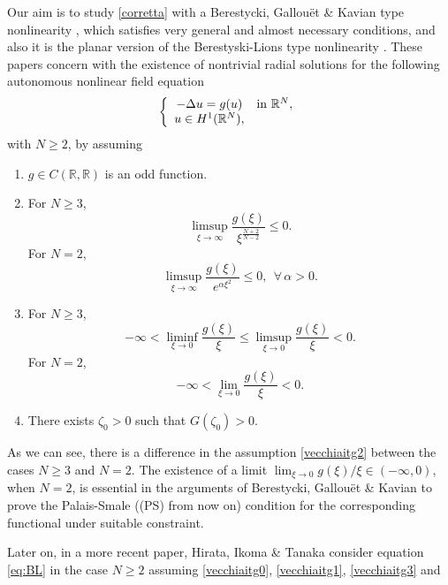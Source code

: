 \documentclass[11pt,leqno,twoside,reqno]{amsart}
\numberwithin{equation}{section}
\begin{document}
Our aim is to study \eqref{corretta} with a Berestycki, Gallou\"et \& Kavian type nonlinearity \cite{BGK}, 
which satisfies very general and almost necessary conditions, and also it is the planar version of the Berestyski-Lions type 
nonlinearity \cite{BL1,BL2}. These papers concern with the existence of nontrivial radial  solutions for the following autonomous nonlinear 
field equation
\begin{equation} \label{eq:BL}	
\left\{\begin{array}{cl}
-\Delta u= g(u) & \hbox{in }{{\mathbb{R}^N}},
\\
u\in H^1({{\mathbb{R}^N}}),
\end{array}
\right.
\end{equation}
with $N{\geqslant} 2$, by assuming 
\begin{enumerate}[label=(g\arabic*),ref=g\arabic*,start=0]
\item \label{vecchiaitg0}
$g\in C(\mathbb R, \mathbb R)$ is an odd function.
\item \label{vecchiaitg1}
For $N{\geqslant} 3$, 
$$ \limsup_{\xi\to\infty}\frac{g(\xi)}{\xi^{\frac{N+2}{N-2}}}{\leqslant}0.$$ 
For $N=2$, 
$$ \limsup_{\xi\to\infty}\frac{g(\xi)}{e^{\alpha\xi^{2}}}{\leqslant} 0,\ \ \forall\, \alpha>0.$$  
\item \label{vecchiaitg2}
For $N{\geqslant} 3$, 
\[
\displaystyle-\infty<\liminf_{\xi\to 0}\frac{g(\xi)}{\xi} {\leqslant} \limsup_{\xi\to 0}\frac{g(\xi)}{\xi}<0.
\]
For $N=2$,
\[
\displaystyle-\infty<\lim_{\xi\to 0}\frac{g(\xi)}{\xi} <0.
\]
\item \label{vecchiaitg3}
There exists $\zeta_{0}>0$ such that $G(\zeta_{0})>0$.
\end{enumerate}

As we can see, there is a difference in the assumption \eqref{vecchiaitg2}  between the cases $N{\geqslant} 3$ and $N=2$. 
The existence of a limit $\lim_{\xi \to 0} g(\xi)/\xi \in (-\infty, 0)$, when $N=2$, is essential in 
the arguments of Berestycki, Gallou\"et \& Kavian \cite{BGK} to prove the Palais-Smale ((PS) from now on) condition for the corresponding functional under suitable constraint.

Later on, in a more recent paper, Hirata, Ikoma \& Tanaka \cite{HIT} consider equation \eqref{eq:BL} in the case $N{\geqslant} 2$ 
assuming \eqref{vecchiaitg0}, \eqref{vecchiaitg1}, \eqref{vecchiaitg3} and 
\end{document}
